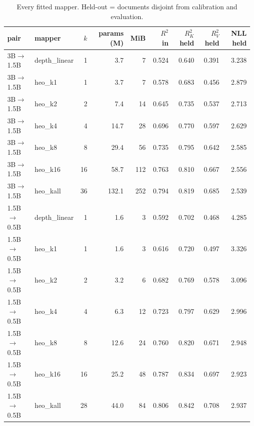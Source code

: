\begin{table}[t]\centering\small\setlength{\tabcolsep}{4pt}\caption{Every fitted mapper. Held-out = documents disjoint from calibration and evaluation.}\label{tab:fit}
\begin{tabular}{llrrrrrrr}\toprule
pair & mapper & $k$ & params (M) & MiB & $R^2$ in & $R^2_K$ held & $R^2_V$ held & NLL held \\\midrule
3B$\to$1.5B & depth\_linear & 1 & 3.7 & 7 & 0.524 & 0.640 & 0.391 & 3.238 \\
3B$\to$1.5B & heo\_k1 & 1 & 3.7 & 7 & 0.578 & 0.683 & 0.456 & 2.879 \\
3B$\to$1.5B & heo\_k2 & 2 & 7.4 & 14 & 0.645 & 0.735 & 0.537 & 2.713 \\
3B$\to$1.5B & heo\_k4 & 4 & 14.7 & 28 & 0.696 & 0.770 & 0.597 & 2.629 \\
3B$\to$1.5B & heo\_k8 & 8 & 29.4 & 56 & 0.735 & 0.795 & 0.642 & 2.585 \\
3B$\to$1.5B & heo\_k16 & 16 & 58.7 & 112 & 0.763 & 0.810 & 0.667 & 2.556 \\
3B$\to$1.5B & heo\_kall & 36 & 132.1 & 252 & 0.794 & 0.819 & 0.685 & 2.539 \\
1.5B$\to$0.5B & depth\_linear & 1 & 1.6 & 3 & 0.592 & 0.702 & 0.468 & 4.285 \\
1.5B$\to$0.5B & heo\_k1 & 1 & 1.6 & 3 & 0.616 & 0.720 & 0.497 & 3.326 \\
1.5B$\to$0.5B & heo\_k2 & 2 & 3.2 & 6 & 0.682 & 0.769 & 0.578 & 3.096 \\
1.5B$\to$0.5B & heo\_k4 & 4 & 6.3 & 12 & 0.723 & 0.797 & 0.629 & 2.996 \\
1.5B$\to$0.5B & heo\_k8 & 8 & 12.6 & 24 & 0.760 & 0.820 & 0.671 & 2.948 \\
1.5B$\to$0.5B & heo\_k16 & 16 & 25.2 & 48 & 0.787 & 0.834 & 0.697 & 2.923 \\
1.5B$\to$0.5B & heo\_kall & 28 & 44.0 & 84 & 0.806 & 0.842 & 0.708 & 2.937 \\
\bottomrule\end{tabular}\end{table}

